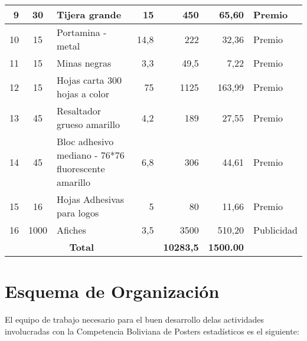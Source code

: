 \documentclass{article}
\begin{document}
\begin{table}[htbp]
{\begin{tabular}{|cccc|r|r|r}
    \midrule
    \multicolumn{1}{|r|}{9} & \multicolumn{1}{c|}{30} & \multicolumn{1}{l|}{Tijera grande} & \multicolumn{1}{r|}{15} & 450   & 65,60 & \multicolumn{1}{l|}{Premio} \\
    \midrule
    \multicolumn{1}{|r|}{10} & \multicolumn{1}{c|}{15} & \multicolumn{1}{l|}{Portamina - metal} & \multicolumn{1}{r|}{14,8} & 222   & 32,36 & \multicolumn{1}{l|}{Premio} \\
    \midrule
    \multicolumn{1}{|r|}{11} & \multicolumn{1}{c|}{15} & \multicolumn{1}{l|}{Minas negras} & \multicolumn{1}{r|}{3,3} & 49,5  & 7,22  & \multicolumn{1}{l|}{Premio} \\
    \midrule
    \multicolumn{1}{|r|}{12} & \multicolumn{1}{c|}{15} & \multicolumn{1}{l|}{Hojas carta 300 hojas a color} & \multicolumn{1}{r|}{75} & 1125  & 163,99 & \multicolumn{1}{l|}{Premio} \\
    \midrule
    \multicolumn{1}{|r|}{13} & \multicolumn{1}{c|}{45} & \multicolumn{1}{l|}{Resaltador grueso amarillo} & \multicolumn{1}{r|}{4,2} & 189   & 27,55 & \multicolumn{1}{l|}{Premio} \\
    \midrule
    \multicolumn{1}{|r|}{14} & \multicolumn{1}{c|}{45} & \multicolumn{1}{l|}{Bloc adhesivo mediano - 76*76 fluorescente amarillo} & \multicolumn{1}{r|}{6,8} & 306   & 44,61 & \multicolumn{1}{l|}{Premio} \\
    \midrule
    \multicolumn{1}{|r|}{15} & \multicolumn{1}{c|}{16} & \multicolumn{1}{l|}{Hojas Adhesivas para logos} & \multicolumn{1}{r|}{5} & 80    & 11,66 & \multicolumn{1}{l|}{Premio} \\
    \midrule
    \multicolumn{1}{|r|}{16} & \multicolumn{1}{c|}{1000} & \multicolumn{1}{l|}{Afiches} & \multicolumn{1}{r|}{3,5} & 3500  & 510,20 & \multicolumn{1}{l|}{Publicidad} \\
    \midrule
    \multicolumn{4}{|c|}{\textbf{Total}} & \textbf{10283,5} & \textbf{1500.00} &  \\
\cmidrule{1-6}    \end{tabular}}%
  \label{tab:addlabel}%
\end{table}%



\section{Esquema de Organización}

El equipo de trabajo necesario para el buen desarrollo delas actividades involucradas con la Competencia Boliviana de Posters estadísticos es el siguiente: 
\end{document}
